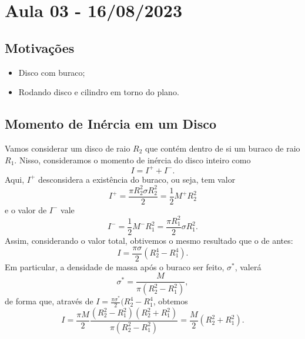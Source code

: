 \documentclass{article}
\begin{document}
\newpage

\section{Aula 03 - 16/08/2023}
\subsection{Motivações}
\begin{itemize}
  \item Disco com buraco;
  \item Rodando disco e cilindro em torno do plano.
\end{itemize}
\subsection{Momento de Inércia em um Disco}
Vamos considerar um disco de raio \(R_{2}\) que contém dentro de si um buraco de
raio \(R_{1}\). Nisso, consideramos o momento de inércia do disco inteiro como 
\[
  I = I^{+} + I^{-}.
\]
Aqui, \(I^{+}\) desconsidera a existência do buraco, ou seja, tem valor 
\[
  I^{+} = \frac{\pi R_{2}^{2}\sigma R_{2}^{2}}{2} = \frac{1}{2}M^{+}R_{2}^{2}
\]
e o valor de \(I^{-}\) vale 
\[
  I^{-} = \frac{1}{2}M^{-}R_{1}^{2} = \frac{\pi R_{1}^{2}}{2}\sigma R_{1}^{2}.
\]
Assim, considerando o valor total, obtivemos o mesmo resultado que o de antes: 
\[
  I = \frac{\pi \sigma }{2}(R_{2}^{4} - R_{1}^{4}).
\]
Em particular, a densidade de massa após o buraco ser feito, \(\sigma^{*} \), valerá
\[
  \sigma ^{*} = \frac{M}{\pi(R_{2}^{2} - R_{1}^{2})},
\]
de forma que, através de \(I = \frac{\pi \sigma^{*}}{2}(R_{2}^{4} - R_{1}^{4}\), obtemos 
\[
  I = \frac{\pi M}{2} \frac{(R_{2}^{2}-R_{1}^{2})(R_{2}^{2}+R_{1}^{2})}{\pi (R_{2}^{2}-R_{1}^{2})} = \frac{M}{2}(R_{2}^{2}+R_{1}^{2}).
\]
\end{document}
